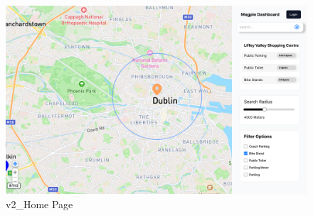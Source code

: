 \begin{figure}[h]
    \centering
    \begin{minipage}{0.48\textwidth}
        \centering
        \includegraphics[width=\textwidth]{images/v2_Home Page.png}
        \caption{v2_Home Page}
        \label{fig:v2_Home Page}
    \end{minipage}
\end{figure}


